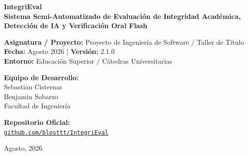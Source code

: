 \documentclass[11pt,a4paper]{article}
\begin{document}
\begin{titlepage}
    \centering
    \vspace*{1.2cm}
    
    {\Huge \textbf{\color{primary} IntegriEval}}\\[0.4cm]
    {\Large \textbf{Sistema Semi-Automatizado de Evaluación de Integridad Académica, Detección de IA y Verificación Oral Flash}}\\[1.2cm]
    
    \begin{tcolorbox}[colback=primary!5!white,colframe=primary,title=Documento de Especificación Formal de Ingeniería de Software]
        \centering
        \vspace{0.2cm}
        \textbf{Asignatura / Proyecto:} Proyecto de Ingeniería de Software / Taller de Título\\
        \textbf{Fecha:} Agosto 2026 \quad $\vert$ \quad \textbf{Versión:} 2.1.0\\
        \textbf{Entorno:} Educación Superior / Cátedras Universitarias
        \vspace{0.2cm}
    \end{tcolorbox}
    
    \vspace{2.2cm}
    
    \begin{minipage}{0.45\textwidth}
        \begin{flushleft} \large
            \textbf{Equipo de Desarrollo:}\\
            Sebastian Cisternas\\
            Benjamin Sobarzo\\[0.2cm]
            \small Facultad de Ingeniería
        \end{flushleft}
    \end{minipage}
    \hfill
    \begin{minipage}{0.45\textwidth}
        \begin{flushright} \large
            \textbf{Repositorio Oficial:}\\
            \href{https://github.com/blosttt/IntegriEval}{\texttt{github.com/blosttt/IntegriEval}}
        \end{flushright}
    \end{minipage}
    
    \vfill
    {\large Agosto, 2026}
\end{titlepage}
\end{document}

